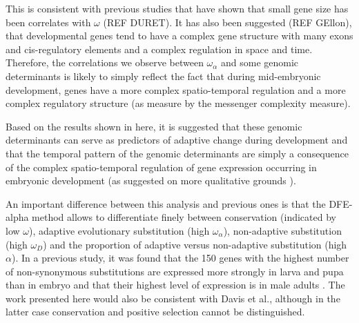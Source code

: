 This is consistent with previous studies that have shown that small gene size has been correlates with $\omega$ \citep{Comeron2012} (REF DURET).
It has also been suggested (REF GEllon), that developmental genes tend to have a complex gene structure with many exons and cis-regulatory elements and a complex regulation in space and time. Therefore, the correlations we observe between $\omega_{\alpha}$ and some genomic determinants is likely to simply reflect the fact that during mid-embryonic development, genes have a more complex spatio-temporal regulation and a more complex regulatory structure (as measure by the messenger complexity measure).

Based on the results shown in here, it is suggested that these genomic determinants can serve as predictors of adaptive change during development and that the temporal pattern of the genomic determinants are simply a consequence of the complex spatio-temporal regulation of gene expression occurring in embryonic 
development (as suggested on more qualitative grounds \citealp{Duboule1998}).

An important difference between this analysis and previous ones is that the DFE-alpha method allows to differentiate finely between conservation (indicated by low $\omega$), adaptive evolutionary substitution (high $\omega_{\alpha}$), non-adaptive substitution (high $\omega_{D}$) and the proportion of adaptive versus non-adaptive substitution (high $\alpha$). 
In a previous study, it was found that the 150 genes with the highest number of non-synonymous substitutions are expressed more strongly in larva and pupa than in embryo and that their highest level of expression is in male adults \citep{Davis2005}.
The work presented here would also be consistent with Davis et al., although in the latter case conservation and positive selection cannot be distinguished.


